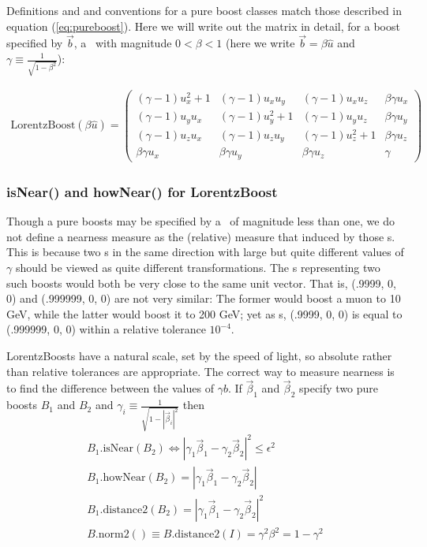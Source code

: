 Definitions and
and conventions for a pure boost classes match those described in equation
(\ref{eq:pureboost}).
Here we will write out the matrix in detail, for a boost specified by
$\vec{b}$, a \SV\ with magnitude $0 < \beta < 1$ (here we write
$\vec{b} = \beta \hat{u} $ and
$\gamma \equiv \frac{1}{\sqrt{1-\beta^2}}$):

\begin{eqnarray}
\label{eq:boostform}
  \mbox{LorentzBoost}(\beta \hat{u}) =
  \left(
  \begin{array}{cccc}
  (\gamma - 1) u_x^2 + 1 & (\gamma - 1) u_x u_y &
  (\gamma - 1) u_x u_z & \beta \gamma u_x
	\\
  (\gamma - 1) u_y u_x & (\gamma - 1) u_y^2 + 1 &
  (\gamma - 1) u_y u_z & \beta \gamma u_y
	\\
  (\gamma - 1) u_z u_x & (\gamma - 1) u_z u_y &
  (\gamma - 1) u_z^2 + 1 & \beta \gamma u_z
	\\
  \beta \gamma u_x & \beta \gamma u_y & 
  \beta \gamma u_z & \gamma
  \end{array}
  \right)
\end{eqnarray}

\subsubsection{isNear() and howNear() for LorentzBoost}

Though a pure boosts may be specified by a \SV\ of magnitude less than one,
we do not define a nearness measure as the (relative) measure that induced
by those \SV s.  This is because two \LB s in the same direction
with large but quite different
values of $\gamma$ should be viewed as quite different transformations.
The \SV s representing two such boosts would both be very close to the same
unit vector.  That is, (.9999, 0, 0) and (.999999, 0, 0) are not very similar:
The former would boost a muon to 10 GeV, while the latter would boost it to
200 GeV; yet as \SV s, (.9999, 0, 0) is equal to (.999999, 0, 0) within
a relative tolerance $10^{-4}$.

LorentzBoosts have a natural scale, set by the speed of light, so absolute
rather than relative tolerances are appropriate.
The correct way to measure nearness is to find the difference between the
values of $\gamma b$.  If $\vec{\beta}_1$ and 
$\vec{\beta}_2$ specify two pure boosts
$B_1$ and $B_2$
and $\gamma_i \equiv \frac{1}{\sqrt{1 - |\vec{\beta}_i|^2}}$ then
\begin{eqnarray}
\label{eq:nearboost}
    B_1 \mbox{.isNear} (B_2) \Longleftrightarrow
	\left| \gamma_1 \vec{\beta}_1 - \gamma_2 \vec{\beta}_2 \right|^2 \leq
	\epsilon^2
	\\
\label{eq:hownearboost}
    B_1 \mbox{.howNear} (B_2) =
	\left| \gamma_1 \vec{\beta}_1 - \gamma_2 \vec{\beta}_2 \right|
	\\
    B_1 \mbox{.distance2} (B_2) =
	\left| \gamma_1 \vec{\beta}_1 - \gamma_2 \vec{\beta}_2 \right|^2
	\\
\label{eq:boostnorm2}
    B\mbox{.norm2}( ) \equiv B\mbox{.distance2} (I) 
					= \gamma^2 \beta^2 = 1 - \gamma^2 
\end{eqnarray}

